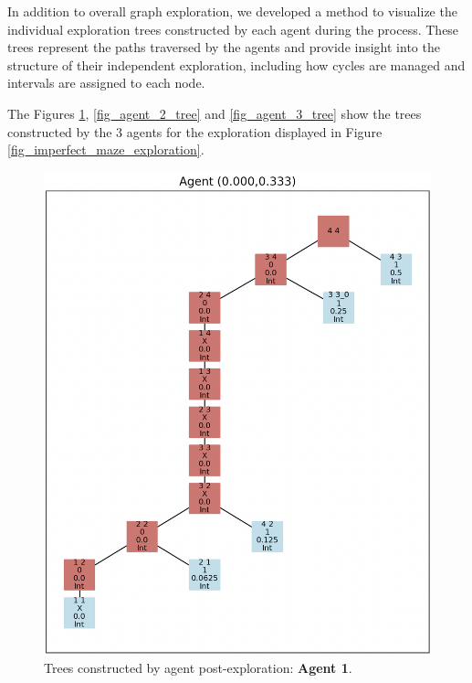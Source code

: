 In addition to overall graph exploration,
we developed a method to visualize the individual exploration trees constructed by each agent during the process. These trees represent the paths traversed by the agents and provide insight into the structure of their independent exploration, including how cycles are managed and intervals are assigned to each node.

The Figures \ref{fig_agent_1_tree}, \ref{fig_agent_2_tree} and \ref{fig_agent_3_tree}
show the trees constructed by the 3 agents for the exploration displayed in Figure \ref{fig_imperfect_maze_exploration}.
    
\begin{figure}[H]
\centering
\includegraphics[width=1\textwidth]{Cap2/agent_1.png}
\caption{Trees constructed by agent post-exploration: \textbf{Agent 1}.}
\label{fig_agent_1_tree}
\end{figure}

